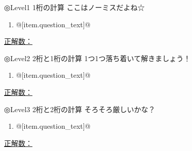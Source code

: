 \documentclass[uplatex,a4j,11pt]{jsarticle}
\begin{document}
◎Level1 \hfill 1桁の計算 \hfill ここはノーミスだよね☆

\begin{minipage}[t][8.1cm][t]{\linewidth}
  \begin{multicols}{2}
    \begin{enumerate}
      \item @[item.question\_text]@
    \end{enumerate}
  \end{multicols}
\end{minipage}

\vfill

\begin{flushright}
  \underline{正解数：\hspace{6em}}
\end{flushright}

\newpage

◎Level2 \hfill 2桁と1桁の計算 \hfill 1つ1つ落ち着いて解きましょう！
　
\begin{minipage}[t][8.1cm][t]{\linewidth}
  \begin{multicols}{2}
    \begin{enumerate}
      \item @[item.question\_text]@
    \end{enumerate}
  \end{multicols}
\end{minipage}

\vfill

\begin{flushright}
  \underline{正解数：\hspace{6em}}
\end{flushright}

\newpage

◎Level3 \hfill 2桁と2桁の計算 \hfill そろそろ厳しいかな？
　
\begin{minipage}[t][8.1cm][t]{\linewidth}
  \begin{multicols}{2}
    \begin{enumerate}
      \item @[item.question\_text]@
    \end{enumerate}
  \end{multicols}
\end{minipage}

\vfill

\begin{flushright}
  \underline{正解数：\hspace{6em}}
\end{flushright}
\end{document}
